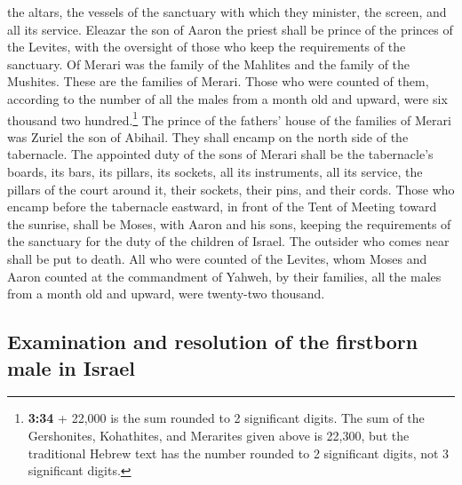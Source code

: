 the altars, the vessels of the sanctuary with which they minister, the
screen, and all its service.  Eleazar the son of Aaron
the priest shall be prince of the princes of the Levites, with the
oversight of those who keep the requirements of the sanctuary.
 Of Merari was the family of the Mahlites and the family
of the Mushites. These are the families of Merari.  Those
who were counted of them, according to the number of all the males from
a month old and upward, were six thousand two hundred.\footnote{\textbf{3:34}
  + 22,000 is the sum rounded to 2 significant digits. The sum of the
  Gershonites, Kohathites, and Merarites given above is 22,300, but the
  traditional Hebrew text has the number rounded to 2 significant
  digits, not 3 significant digits.}  The prince of the
fathers' house of the families of Merari was Zuriel the son of Abihail.
They shall encamp on the north side of the tabernacle. 
The appointed duty of the sons of Merari shall be the tabernacle's
boards, its bars, its pillars, its sockets, all its instruments, all its
service,  the pillars of the court around it, their
sockets, their pins, and their cords.  Those who encamp
before the tabernacle eastward, in front of the Tent of Meeting toward
the sunrise, shall be Moses, with Aaron and his sons, keeping the
requirements of the sanctuary for the duty of the children of Israel.
The outsider who comes near shall be put to death.  All
who were counted of the Levites, whom Moses and Aaron counted at the
commandment of Yahweh, by their families, all the males from a month old
and upward, were twenty-two thousand.

\hypertarget{examination-and-resolution-of-the-firstborn-male-in-israel}{%
\subsection{Examination and resolution of the firstborn male in
Israel}\label{examination-and-resolution-of-the-firstborn-male-in-israel}}


